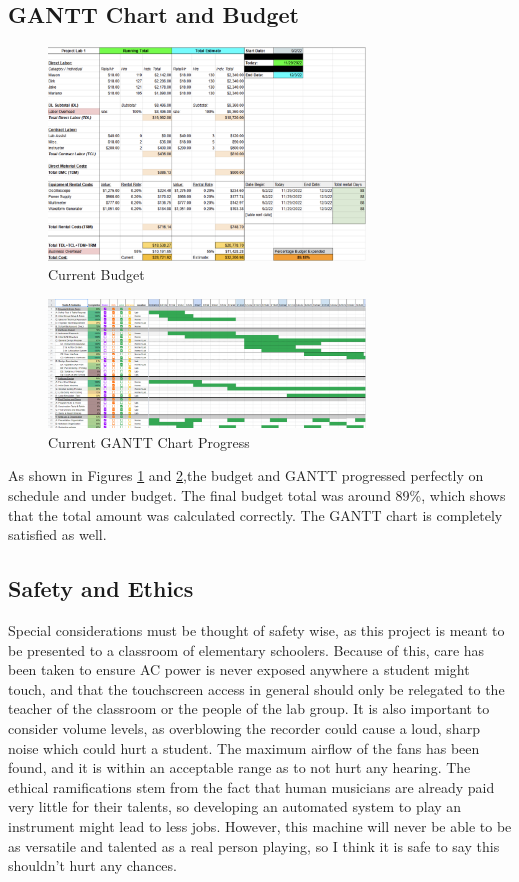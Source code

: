 \documentclass[UTF8, 12pt]{article}
\begin{document}
\subsection{GANTT Chart and Budget}
    \begin{figure}[h]
        \centering
        \includegraphics[width=0.75\textwidth]{budget.png}
        \caption{Current Budget}
        \label{bud_fig}
    \end{figure}
    \begin{figure}[h]
        \centering
        \includegraphics[width=0.75\textwidth]{gantt.png}
        \caption{Current GANTT Chart Progress}
        \label{gan_fig}
    \end{figure}
    As shown in Figures \ref{bud_fig} and \ref{gan_fig},the budget and GANTT progressed perfectly on schedule and under budget. The final budget total was around 89\%, which shows that the total amount was calculated correctly. The GANTT chart is completely satisfied as well.
\subsection{Safety and Ethics}
    Special considerations must be thought of safety wise, as this project is meant to be presented to a classroom of elementary schoolers. Because of this, care has been taken to ensure AC power is never exposed anywhere a student might touch, and that the touchscreen access in general should only be relegated to the teacher of the classroom or the people of the lab group. It is also important to consider volume levels, as overblowing the recorder could cause a loud, sharp noise which could hurt a student. The maximum airflow of the fans has been found, and it is within an acceptable range as to not hurt any hearing. The ethical ramifications stem from the fact that human musicians are already paid very little for their talents, so developing an automated system to play an instrument might lead to less jobs. However, this machine will never be able to be as versatile and talented as a real person playing, so I think it is safe to say this shouldn't hurt any chances.

\newpage
\printbibliography
\end{document}
